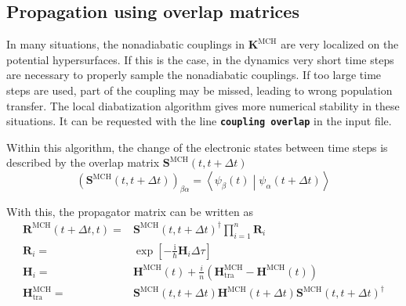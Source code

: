 \documentclass[a4paper,10pt,DIV=15,openany,twoside=false]{scrbook}
\newcommand{\ttt}[1]{\textbf{\texttt{#1}}}
\newcommand{\I}{\ensuremath{\mathrm{i}}}
\newcommand{\VEC}[1]{\ensuremath{\mathbf{#1}}}
\begin{document}
\subsection{Propagation using overlap matrices}

In many situations, the nonadiabatic couplings in $\VEC{K}^{\text{MCH}}$ are very localized on the potential hypersurfaces. If this is the case, in the dynamics very short time steps are necessary to properly sample the nonadiabatic couplings. If too large time steps are used, part of the coupling may be missed, leading to wrong population transfer. The local diabatization algorithm gives more numerical stability in these situations. It can be requested with the line \ttt{coupling overlap} in the input file.

Within this algorithm, the change of the electronic states between time steps is described by the overlap matrix $\VEC{S}^{\text{MCH}}(t,t+\Delta t)$
\begin{equation}
  \left(\VEC{S}^{\text{MCH}}(t,t+\Delta t)\right)_{\beta\alpha}=
  \left\langle
    \psi_\beta(t)
  \middle|
    \psi_\alpha(t+\Delta t)
  \right\rangle
\end{equation}

With this, the propagator matrix can be written as
\begin{align}
  \VEC{R}^{\text{MCH}}(t+\Delta t,t)=&
  \VEC{S}^{\text{MCH}}(t,t+\Delta t)^\dagger\prod\limits_{i=1}^{n}
  \VEC{R}_i\\
  \VEC{R}_i=&
  \exp\left[
      -\frac{\I}{\hbar}\VEC{H}_i\Delta\tau
  \right]\\
  \VEC{H}_i=&
  \VEC{H}^{\text{MCH}}(t) + \frac{i}{n}
  \left(
    \VEC{H}^{\text{MCH}}_{\text{tra}}
    -\VEC{H}^{\text{MCH}}(t)
  \right)\label{eq:ham_propl}\\
  \VEC{H}^{\text{MCH}}_{\text{tra}}=&
    \VEC{S}^{\text{MCH}}(t,t+\Delta t)
    \VEC{H}^{\text{MCH}}(t+\Delta t)
    \VEC{S}^{\text{MCH}}(t,t+\Delta t)^\dagger
\end{align}








\end{document}
